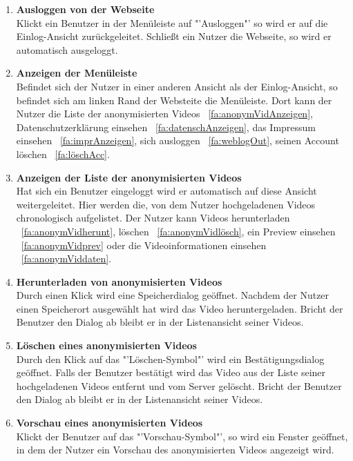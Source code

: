 \begin{enumerate}
\item \label{fa:weblogOut}\textbf{Ausloggen von der Webseite} \hfill \\
Klickt ein Benutzer in der Menüleiste auf "'Ausloggen"' so wird er auf die Einlog-Ansicht zurückgeleitet. Schließt ein Nutzer die Webseite, so wird er automatisch ausgeloggt.

\item \textbf{Anzeigen der Menüleiste} \hfill \\
Befindet sich der Nutzer in einer anderen Ansicht als der Einlog-Ansicht, so befindet sich am linken Rand der Websteite die Menüleiste. Dort kann der Nutzer die Liste der anonymisierten Videos ~\eqref{fa:anonymVidAnzeigen}, Datenschutzerklärung einsehen ~\eqref{fa:datenschAnzeigen}, das Impressum einsehen ~\eqref{fa:imprAnzeigen}, sich ausloggen ~\eqref{fa:weblogOut}, seinen Account löschen ~\eqref{fa:löschAcc}.

\item \label{fa:anonymVidAnzeigen}\textbf{Anzeigen der Liste der anonymisierten Videos} \hfill \\
Hat sich ein Benutzer eingeloggt wird er automatisch auf diese Ansicht weitergeleitet. Hier werden die, von dem Nutzer hochgeladenen Videos chronologisch aufgelistet. Der Nutzer kann Videos herunterladen ~\eqref{fa:anonymVidherunt}, löschen ~\eqref{fa:anonymVidlösch}, ein Preview einsehen ~\eqref{fa:anonymVidprev} oder die Videoinformationen einsehen ~\eqref{fa:anonymViddaten}.

\item \label{fa:anonymVidherunt}\textbf{Herunterladen von anonymisierten Videos} \hfill \\
Durch einen Klick wird eine Speicherdialog geöffnet. Nachdem der Nutzer einen Speicherort ausgewählt hat wird das Video heruntergeladen. Bricht der Benutzer den Dialog ab bleibt er in der Listenansicht seiner Videos.

\item \label{fa:anonymVidlösch}\textbf{Löschen eines anonymisierten Videos} \hfill \\
Durch den Klick auf das "'Löschen-Symbol"' wird ein Bestätigungsdialog geöffnet. Falls der Benutzer bestätigt wird das Video aus der Liste seiner hochgeladenen Videos entfernt und vom Server gelöscht. Bricht der Benutzer den Dialog ab bleibt er in der Listenansicht seiner Videos.

\item \label{fa:anonymVidprev}\textbf{Vorschau eines anonymisierten Videos} \hfill \\
Klickt der Benutzer auf das "'Vorschau-Symbol"', so wird ein Fenster geöffnet, in dem der Nutzer ein Vorschau des anonymisierten Videos angezeigt wird.


\end{enumerate}
